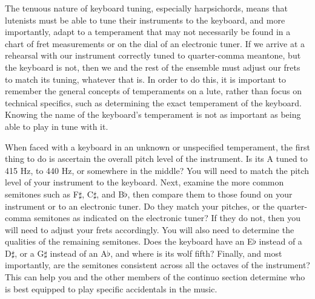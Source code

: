 The tenuous nature of keyboard tuning, especially harpsichords, means that lutenists must be able to tune their
instruments to the keyboard, and more importantly, adapt to a temperament that may not necessarily be found in a chart
of fret measurements or on the dial of an electronic tuner. If we arrive at a rehearsal with our instrument correctly
tuned to quarter-comma meantone, but the keyboard is not, then we and the rest of the ensemble must adjust our frets to
match its tuning, whatever that is. In order to do this, it is important to remember the general concepts of
temperaments on a lute, rather than focus on technical specifics, such as determining the exact temperament of the
keyboard. Knowing the name of the keyboard's temperament is not as important as being able to play in tune with it.

When faced with a keyboard in an unknown or unspecified temperament, the first thing to do is ascertain the overall
pitch level of the instrument. Is its A tuned to 415 Hz, to 440 Hz, or somewhere in the middle? You will need to match
the pitch level of your instrument to the keyboard. Next, examine the more common semitones such as F$\sharp$,
C$\sharp$, and B$\flat$, then compare them to those found on your instrument or to an electronic tuner. Do they match
your pitches, or the quarter-comma semitones as indicated on the electronic tuner? If they do not, then you will need to
adjust your frets accordingly. You will also need to determine the qualities of the remaining semitones. Does the
keyboard have an E$\flat$ instead of a D$\sharp$, or a G$\sharp$ instead of an A$\flat$, and where is its wolf fifth?
Finally, and most importantly, are the semitones consistent across all the octaves of the instrument? This can help you
and the other members of the continuo section determine who is best equipped to play specific accidentals in the music.

